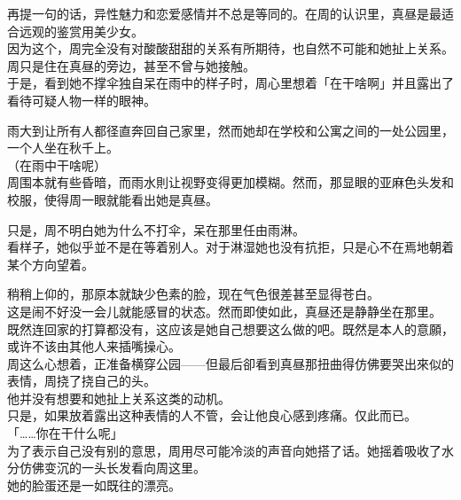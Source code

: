 再提一句的话，异性魅力和恋爱感情并不总是等同的。在周的认识里，真昼是最适合远观的鉴赏用美少女。\\

因为这个，周完全没有对酸酸甜甜的关系有所期待，也自然不可能和她扯上关系。周只是住在真昼的旁边，甚至不曾与她接触。\\

于是，看到她不撑伞独自呆在雨中的样子时，周心里想着「在干啥啊」并且露出了看待可疑人物一样的眼神。\\

\vspace{2\baselineskip}

雨大到让所有人都径直奔回自己家里，然而她却在学校和公寓之间的一处公园里，一个人坐在秋千上。\\

（在雨中干啥呢）\\

周围本就有些昏暗，而雨水則让视野变得更加模糊。然而，那显眼的亚麻色头发和校服，使得周一眼就能看出她是真昼。

只是，周不明白她为什么不打伞，呆在那里任由雨淋。\\

看样子，她似乎並不是在等着别人。对于淋湿她也没有抗拒，只是心不在焉地朝着某个方向望着。

稍稍上仰的，那原本就缺少色素的脸，现在气色很差甚至显得苍白。\\

这是闹不好没一会儿就能感冒的状态。然而即使如此，真昼还是静静坐在那里。\\

既然连回家的打算都没有，这应该是她自己想要这么做的吧。既然是本人的意願，或许不该由其他人来插嘴操心。\\

周这么心想着，正准备横穿公园——但最后卻看到真昼那扭曲得仿佛要哭出來似的表情，周挠了挠自己的头。\\

他并没有想要和她扯上关系这类的动机。\\

只是，如果放着露出这种表情的人不管，会让他良心感到疼痛。仅此而已。\\

「……你在干什么呢」\\

为了表示自己没有别的意思，周用尽可能冷淡的声音向她搭了话。她摇着吸收了水分仿佛变沉的一头长发看向周这里。\\

她的脸蛋还是一如既往的漂亮。

